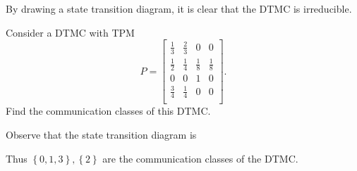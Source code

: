\documentclass[stat333]{subfiles}
\begin{document}
    \begin{subproof}[Answer]
        By drawing a state transition diagram, it is clear that the DTMC is irreducible.
    \end{subproof}

    \ex Consider a DTMC with TPM
    \begin{equation*}
        P =
        \begin{bmatrix}
        	\frac{1}{3} & \frac{2}{3} & 0 & 0 \\
        	\frac{1}{2} & \frac{1}{4} & \frac{1}{8} & \frac{1}{8} \\
        	0 & 0 & 1 & 0 \\
        	\frac{3}{4} & \frac{1}{4} & 0 & 0 \\
        \end{bmatrix}.
    \end{equation*}
    Find the communication classes of this DTMC.

    \begin{subproof}[Answer]
        Observe that the state transition diagram is
        \begin{center}
        \end{center}
        Thus $\left\lbrace 0,1,3 \right\rbrace, \left\lbrace 2 \right\rbrace$ are the communication classes of the DTMC.
    \end{subproof}







































    
\end{document}
